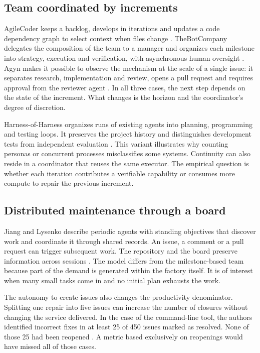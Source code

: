 \documentclass[11pt,a4paper]{article}
\begin{document}
\subsection{Team coordinated by increments}
AgileCoder keeps a backlog, develops in iterations and updates a code dependency graph to select context when files change \citep{agile}. TheBotCompany delegates the composition of the team to a manager and organizes each milestone into strategy, execution and verification, with asynchronous human oversight \citep{bot}. Agyn makes it possible to observe the mechanism at the scale of a single issue: it separates research, implementation and review, opens a pull request and requires approval from the reviewer agent \citep{agyn}. In all three cases, the next step depends on the state of the increment. What changes is the horizon and the coordinator's degree of discretion.

Harness-of-Harness organizes runs of existing agents into planning, programming and testing loops. It preserves the project history and distinguishes development tests from independent evaluation \citep{hoh}. This variant illustrates why counting personas or concurrent processes misclassifies some systems. Continuity can also reside in a coordinator that reuses the same executor. The empirical question is whether each iteration contributes a verifiable capability or consumes more compute to repair the previous increment.

\subsection{Distributed maintenance through a board}
Jiang and Lysenko describe periodic agents with standing objectives that discover work and coordinate it through shared records. An issue, a comment or a pull request can trigger subsequent work. The repository and the board preserve information across sessions \citep{instant}. The model differs from the milestone-based team because part of the demand is generated within the factory itself. It is of interest when many small tasks come in and no initial plan exhausts the work.

The autonomy to create issues also changes the productivity denominator. Splitting one repair into five issues can increase the number of closures without changing the service delivered. In the case of the command-line tool, the authors identified incorrect fixes in at least 25 of 450 issues marked as resolved. None of those 25 had been reopened \citep[observation O4]{instant}. A metric based exclusively on reopenings would have missed all of those cases.
\end{document}
